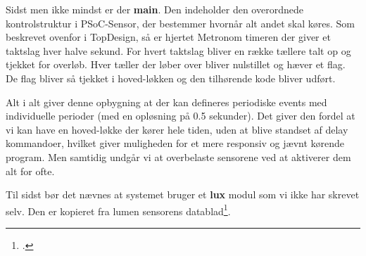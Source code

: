 Sidst men ikke mindst er der \textbf{main}. Den indeholder den overordnede kontrolstruktur i PSoC-Sensor, der bestemmer hvornår alt andet skal køres. Som beskrevet ovenfor i TopDesign, så er hjertet Metronom timeren der giver et taktslag hver halve sekund. For hvert taktslag bliver en række tællere talt op og tjekket for overløb. Hver tæller der løber over bliver nulstillet og hæver et flag. De flag bliver så tjekket i hoved-løkken og den tilhørende kode bliver udført.

Alt i alt giver denne opbygning at der kan defineres periodiske events med individuelle perioder (med en opløsning på 0.5 sekunder). Det giver den fordel at vi kan have en hoved-løkke der kører hele tiden, uden at blive standset af delay kommandoer, hvilket giver muligheden for et mere responsiv og jævnt kørende program. Men samtidig undgår vi at overbelaste sensorene ved at aktiverer dem alt for ofte.

Til sidst bør det nævnes at systemet bruger et \textbf{lux} modul som vi ikke har skrevet selv. Den er kopieret fra lumen sensorens datablad\footcite{TSL2561}.
